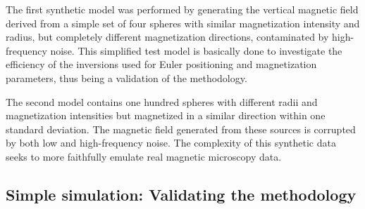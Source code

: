 The first synthetic model was performed by generating the vertical magnetic field derived from a simple set of four spheres with similar magnetization intensity and radius, but completely different magnetization directions, contaminated by high-frequency noise. This simplified test model is basically done to investigate the efficiency of the inversions used for Euler positioning and magnetization parameters, thus being a validation of the methodology.

The second model contains one hundred spheres with different radii and magnetization intensities but magnetized in a similar direction within one standard deviation. The magnetic field generated from these sources is corrupted by both low and high-frequency noise. The complexity of this synthetic data seeks to more faithfully emulate real magnetic microscopy data.


\subsection{Simple simulation: Validating the methodology}

